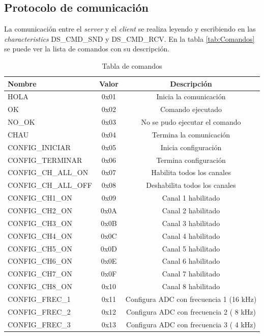 \subsection{Protocolo de comunicación}
La comunicación entre el \textit{server} y el \textit{client} se realiza leyendo y escribiendo en las \textit{characteristics} DS\_CMD\_SND y DS\_CMD\_RCV. En la tabla \ref{tab:Comandos} se puede ver la lista de comandos con su descripción.

\begin{table}[h]
\centering
\caption[Tabla de comandos]{Tabla de comandos}
\begin{tabular}{l c c}
\toprule
\textbf{Nombre} & \textbf{Valor} & \textbf{Descripción}\\
\midrule
HOLA				&	0x01	&	Inicia la comunicación\\  
OK             	&	0x02	&	Comando ejecutado \\
NO\_OK    		&	0x03	&	No se pudo ejecutar el comando\\
CHAU    			&	0x04	&	Termina la comunicación\\
CONFIG\_INICIAR	&	0x05	&	Inicia configuración\\
CONFIG\_TERMINAR	&	0x06	&	Termina configuración\\
CONFIG\_CH\_ALL\_ON	& 	0x07	&	Habilita todos los canales\\
CONFIG\_CH\_ALL\_OFF &	0x08	&	Deshabilita todos los canales\\
CONFIG\_CH1\_ON    &	0x09	&	Canal 1 habilitado\\
CONFIG\_CH2\_ON    &	0x0A	&	Canal 2 habilitado\\
CONFIG\_CH3\_ON    &	0x0B	&	Canal 3 habilitado\\
CONFIG\_CH4\_ON    &	0x0C	&	Canal 4 habilitado\\
CONFIG\_CH5\_ON    &	0x0D	&	Canal 5 habilitado\\
CONFIG\_CH6\_ON    &	0x0E	&	Canal 6 habilitado\\
CONFIG\_CH7\_ON    &	0x0F	&	Canal 7 habilitado\\
CONFIG\_CH8\_ON    &	0x10	&	Canal 8 habilitado\\
CONFIG\_FREC\_1    &	0x11	&	Configura ADC con frecuencia 1 (16 kHz)\\
CONFIG\_FREC\_2    &	0x12	&	Configura ADC con frecuencia 2 ( 8 kHz)\\
CONFIG\_FREC\_3    &	0x13	&	Configura ADC con frecuencia 3 ( 4 kHz)\\

\end{tabular}
\end{table}
